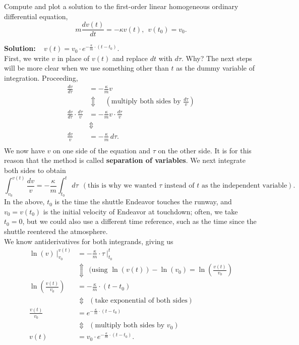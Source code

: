 \begin{example} 
\label{eq:ChuteODE01}
Compute and plot a solution to the first-order linear homogeneous ordinary differential equation, 
\begin{equation}
\label{eq:1stOrderLinearHomogeneous}
    m \frac{dv(t)}{dt} =  - \kappa v(t), ~~v(t_0) = v_0.
\end{equation}
    
\end{example}
\textbf{Solution:} \Ans~ $v(t)  = v_0 \cdot e^{ -\frac{\kappa}{m} \cdot \left( t - t_0 \right)}.$\\

First, we write $v$ in place of $v(t)$ and replace $dt$ with $d \tau$. Why? The next steps will be more clear when we use something other than $t$ as the dummy variable of integration. Proceeding, 
\begin{align*}
     \frac{dv}{d \tau} &=  - \frac{\kappa}{m} v\\
     & \Updownarrow  ~~~~~(\text{multiply both sides by } \frac{d \tau}{v})\\
    \frac{dv}{d \tau} \cdot \frac{d \tau}{v} &=  - \frac{\kappa}{m} v \cdot \frac{d \tau}{v} \\
     & \Updownarrow \\
    \frac{dv}{v}&=  - \frac{\kappa}{m} \, d \tau.\\     
\end{align*}
We now have $v$ on one side of the equation and $\tau$ on the other side. It is for this reason that the method is called \textbf{separation of variables}. We next integrate both sides to obtain
$$ \int_{v_0}^{v(t)}  \frac{dv}{v}=  - \frac{\kappa}{m} \int_{t_0}^t  \, d \tau ~~(\text{this is why we wanted $\tau$ instead of $t$ as the independent variable}).$$
In the above, $t_0$ is the time the shuttle Endeavor touches the runway, and $v_0=v(t_0)$ is the initial velocity of Endeavor at touchdown; often, we take $t_0=0$, but we could also use a different time reference, such as the time since the shuttle reentered the atmosphere.\\

We know antiderivatives for both integrands, giving us
\begin{align*}
\ln(v)~\bigg|_{v_0}^{v(t)}  &=  -\frac{\kappa}{m} \cdot \tau~\bigg|_{t_0}^t \\
                                & \Updownarrow  ~~(\text{using }  \ln(v(t)) - \ln(v_0) = \ln\left( \frac{v(t)}{v_0} \right) \\
 \ln\left( \frac{v(t)}{v_0} \right)   &= -\frac{\kappa}{m} \cdot \left( t - t_0 \right) \\     
  & \Updownarrow   ~~(\text{take exponential of both sides})\\
   \frac{v(t)}{v_0} &= e^{ -\frac{\kappa}{m} \cdot \left( t - t_0 \right)} \\
    & \Updownarrow  ~~(\text{multiply both sides by }v_0) \\ 
    v(t) & = v_0 \cdot e^{ -\frac{\kappa}{m} \cdot \left( t - t_0 \right)}.
\end{align*}

